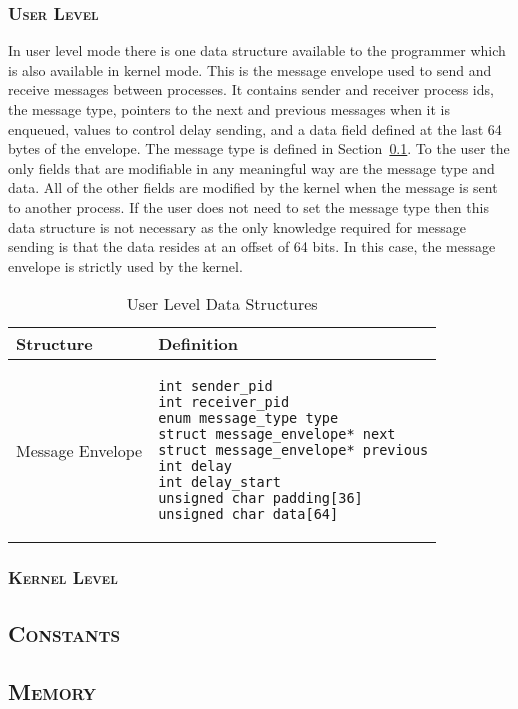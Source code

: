 \documentclass[oneside]{report}
\begin{document}
\subsubsection{\textsc{User Level}}
In user level mode there is one data structure available to the programmer
which is also available in kernel mode. This is the message envelope used to
send and receive messages between processes. It contains sender and receiver
process ids, the message type, pointers to the next and previous messages when
it is enqueued, values to control delay sending, and a data field defined at
the last 64 bytes of the envelope. The message type is defined in
Section~\ref{sec:global_constants}. To the user the only fields that are
modifiable in any meaningful way are the message type and data. All of the
other fields are modified by the kernel when the message is sent to another
process. If the user does not need to set the message type then this data
structure is not necessary as the only knowledge required for message sending
is that the data resides at an offset of 64 bits. In this case, the message
envelope is strictly used by the kernel.

\begin{table}[H]
    \caption{User Level Data Structures}
    \label{user_data_structs}
    \begin{tabular}{| l | p{8cm} |}
        \hline
        Structure & Definition \\
        \hline
        Message Envelope &
\begin{verbatim}
int sender_pid
int receiver_pid
enum message_type type
struct message_envelope* next
struct message_envelope* previous
int delay
int delay_start
unsigned char padding[36]
unsigned char data[64]
\end{verbatim} \\
        \hline
    \end{tabular}
\end{table}

\subsubsection{\textsc{Kernel Level}}


\subsection{\textsc{Constants}}
\label{sec:global_constants}


\subsection{\textsc{Memory}}
\label{sec:mem_management}
\end{document}
